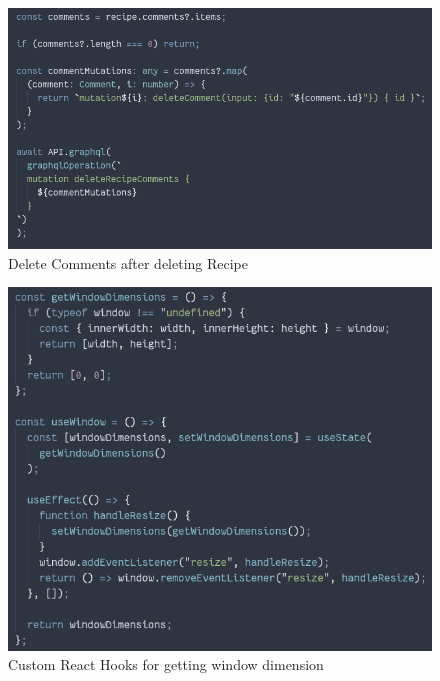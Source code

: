 \begin{figure}[!hb]
\centering
\caption[Delete Comments after deleting Recipe]{Delete Comments after deleting Recipe}%
\label{fig:delete_comments}
\includegraphics[width=\linewidth,height=\textheight,keepaspectratio]{img/delete_comments}
\end{figure} 

\begin{figure}[!hb]
\centering
\caption[Custom React Hooks for getting window dimension]{Custom React Hooks for getting window dimension}%
\label{fig:custom_hooks_use_window}
\includegraphics[width=\linewidth,height=\textheight,keepaspectratio]{img/custom_hooks_use_window}
\end{figure} 

